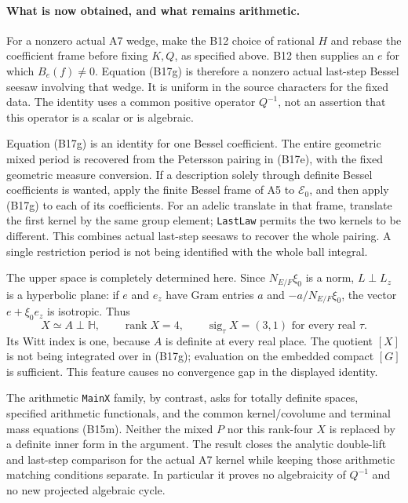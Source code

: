 \paragraph{What is now obtained, and what remains arithmetic.}
For a nonzero actual A7 wedge, make the B12 choice of rational
$H$ and rebase the coefficient frame before fixing $K,Q$, as
specified above. B12 then supplies an $e$ for which $B_e(f)\ne0$.
Equation (B17g) is therefore a
nonzero actual last-step Bessel seesaw involving that wedge.
It is uniform in the source characters for the fixed data.
The identity uses a common positive operator $Q^{-1}$, not
an assertion that this operator is a scalar or is algebraic.

Equation (B17g) is an identity for one Bessel coefficient.
The entire geometric mixed period is recovered from the
Petersson pairing in (B17e), with the fixed geometric measure
conversion. If a description solely through definite Bessel
coefficients is wanted, apply the finite Bessel frame of A5 to
$\mathcal E_0$, and then apply (B17g) to each of its coefficients.
For an adelic translate in that frame, translate the first
kernel by the same group element; \texttt{LastLaw} permits the
two kernels to be different. This combines actual last-step
seesaws to recover the whole pairing. A single restriction
period is not being identified with the whole ball integral.

The upper space is completely determined here. Since
$N_{E/F}\xi_0$ is a norm, $L\perp L_z$ is a hyperbolic plane:
if $e$ and $e_z$ have Gram entries $a$ and
$-a/N_{E/F}\xi_0$, the vector $e+\xi_0e_z$ is isotropic.
Thus
\[
 X\simeq A\perp\mathbb H,\qquad
 \operatorname{rank}X=4,\qquad
 \operatorname{sig}_\tau X=(3,1)
        \text{ for every real }\tau .
\]
Its Witt index is one, because $A$ is definite at every real
place. The quotient $[X]$ is not being integrated over in
(B17g); evaluation on the embedded compact $[G]$ is sufficient.
This feature causes no convergence gap in the displayed
identity.

The arithmetic \texttt{MainX} family, by contrast, asks for
totally definite spaces, specified arithmetic functionals,
and the common kernel/covolume and terminal mass equations
(B15m). Neither the mixed $P$ nor this rank-four $X$ is replaced
by a definite inner form in the argument. The result closes
the analytic double-lift and last-step comparison for the
actual A7 kernel while keeping those arithmetic matching
conditions separate. In particular it proves no algebraicity
of $Q^{-1}$ and no new projected algebraic cycle.
